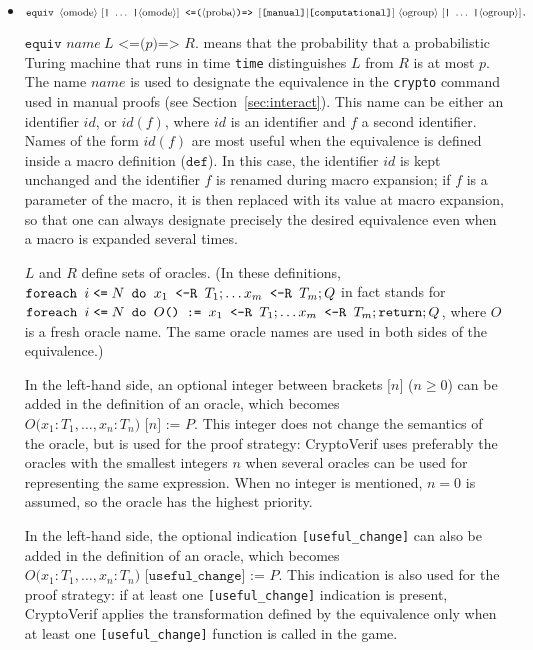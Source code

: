 \begin{itemize}
\begin{itemize}
\end{itemize}
\else
\item $\texttt{equiv }\nonterm{omode}\ [\texttt{|}\ \ldots\ \texttt{|}\nonterm{omode}]\texttt{ <=(}\nonterm{proba}\texttt{)=> }
[\texttt{[manual]}| \texttt{[computational]}]\ \nonterm{ogroup}\ [\texttt{|}\ \ldots\ \texttt{|}\nonterm{ogroup}]\texttt{.}$

$\texttt{equiv }\mathit{name}\ L\texttt{ <=(}p\texttt{)=> }R\texttt{.}$ means that the
probability that a probabilistic Turing machine that runs in time
{\tt time} distinguishes $L$ from $R$ is at most $p$. The name $\mathit{name}$
is used to designate the equivalence in the \texttt{crypto} command used in manual proofs (see Section~\ref{sec:interact}). This name can be either an identifier $\mathit{id}$, or $\mathit{id}(f)$, where $\mathit{id}$ is an identifier and $f$ a second identifier. Names of the form $\mathit{id}(f)$ are most useful when the equivalence is defined inside a macro definition ($\texttt{def}$). In this case, the identifier $\mathit{id}$ is kept unchanged and the identifier $f$ is renamed during macro expansion; if $f$ is a parameter of the macro, it is then replaced with its value at macro expansion, so that one can always designate precisely the desired equivalence even when a macro is expanded several times.

$L$ and $R$ define sets of oracles. (In these definitions, 
$\texttt{foreach }i\mathrel{\texttt{<=}} N\texttt{ do }{x_1}\texttt{ <-R }{T_1}; \ldots
{x_m}\texttt{ <-R }{T_m};Q$ in fact stands for $\texttt{foreach }i\mathrel{\texttt{<=}} N
\texttt{ do }O\texttt{() := } {x_1}\texttt{ <-R }{T_1}; \ldots {x_m}\texttt{ <-R }{T_m};
\texttt{return}; Q$, where $O$ is a fresh oracle name. The same oracle
names are used in both sides of the equivalence.)

In the left-hand side, an optional integer between brackets
$\texttt{[}n\texttt{]}$ ($n \geq 0$) can be added in the
definition of an oracle, which becomes 
$O\texttt{(}x_1:T_1, \ldots, x_n:T_n\texttt{) [}n\texttt{] := }P$.
This integer does not change the semantics of the oracle, but is
used for the proof strategy: CryptoVerif uses preferably the oracles
with the smallest integers $n$ when several oracles can be used
for representing the same expression. When no integer is mentioned,
$n = 0$ is assumed, so the oracle has the highest priority.

In the left-hand side, the optional indication \texttt{[useful\_change]} can also
be added in the definition of an oracle, which becomes 
$O\texttt{(}x_1:T_1, \ldots, x_n:T_n\texttt{) [useful\_change] := }P$.
This indication is also used for the proof strategy: 
if at least one \texttt{[useful\_change]} indication is present,
CryptoVerif applies the transformation defined by the equivalence
only when at least one \texttt{[useful\_change]} function is called in the game.


\end{itemize}
